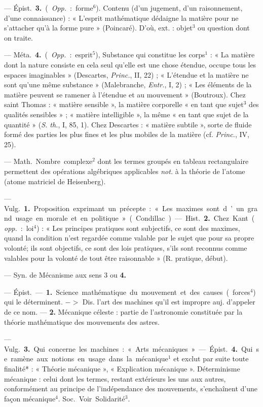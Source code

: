 \begin{itemize}[leftmargin=1cm, label=, itemsep=1pt]
— \si{Épist.} {\bf 3.} ({\it Opp.} : forme$^6$). Contenu (d'un jugement, d’un raisonnement, d’une connaissance) : « L’esprit mathématique dédaigne la matière pour ne s’attacher qu'à la
forme pure » (Poincaré). D'où, ext. :
objet$^3$ ou question dont on traite.

— \si{Méta.} {\bf 4.} ({\it Opp.} : esprit$^5$), Substance qui constitue les corps$^1$ : « La
matière dont la nature consiste en
cela seul qu’elle est une chose étendue, occupe tous les espaces imaginables » (Descartes, {\it Princ.}, II, 22) ;
« L’étendue et la matière ne sont
qu'une même substance » (Malebranche, {\it Entr.}, I, 2) ; « Les éléments
de la matière peuvent se ramener à
l'étendue et au mouvement » (Boutroux). Chez saint Thomas : « matière sensible », la matière corporelle
« en tant que sujet$^3$ des qualités
sensibles » ; « matière intelligible »,
la même « en tant que sujet de la
quantité » ({\it S. th.}, I, 85, 1). Chez Descartes : « matière subtile », sorte de
fluide formé des parties les plus
fines et les plus mobiles de la matière (cf. {\it Princ.}, IV, 25).

 — \si{Math.} Nombre complexe$^2$
dont les termes groupés en tableau
rectangulaire permettent des opérations algébriques applicables {\it not.} à
la théorie de l'atome (atome matriciel de Heisenberg).

 — \si{Vulg.} {\bf 1.} Proposition exprimant un précepte : « Les maximes
sont d’un grand usage en morale et
en politique » (Condillac). — \si{Hist.}
 {\bf 2.} Chez Kant ({\it opp.} : loi$^4$) : « Les principes pratiques sont subjectifs, ce
sont des maximes, quand la condition n’est regardée comme valable
par le sujet que pour sa propre volonté; ils sont objectifs, ce sont des
lois pratiques, s’ils sont reconnus
comme valables pour la volonté de
tout être raisonnable » (R. pratique,
début).

 — Syn. de Mécanisme
aux sens 3 ou {\bf 4.}

 — \si{Épist.} — {\bf 1.} Science
mathématique du mouvement et des
causes (forces$^4$) qui le déterminent.
$->$ Dis. l'art des machines qu'il
est impropre auj. d’appeler de ce
nom. — {\bf 2.} Mécanique céleste : partie
de l'astronomie constituée par la
théorie mathématique des mouvements des astres.

 — \si{Vulg.} {\bf 3.} Qui concerne les machines : « Arts mécaniques ».

— \si{Épist.} {\bf 4.} Qui se ramène aux
notions en usage dans la mécanique$^1$
et exclut par suite toute finalité* :
« Théorie mécanique », « Explication mécanique ». Déterminisme
mécanique : celui dont les termes,
restant extérieurs les uns aux autres,
conformément au principe de l’indépendance des mouvements, s’enchaînent d’une façon mécanique$^4$.
\si{Soc.} Voir Solidarité$^3$.


\end{itemize}
